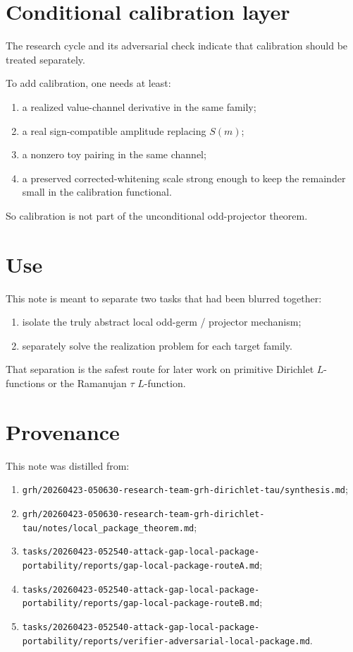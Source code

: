 \documentclass[11pt]{article}
\begin{document}
\section{Conditional calibration layer}

The research cycle and its adversarial check indicate that calibration should
be treated separately.

To add calibration, one needs at least:

\begin{enumerate}
\item a realized value-channel derivative in the same family;
\item a real sign-compatible amplitude replacing \(S(m)\);
\item a nonzero toy pairing in the same channel;
\item a preserved corrected-whitening scale strong enough to keep the remainder
small in the calibration functional.
\end{enumerate}

So calibration is not part of the unconditional odd-projector theorem.

\section{Use}

This note is meant to separate two tasks that had been blurred together:

\begin{enumerate}
\item isolate the truly abstract local odd-germ / projector mechanism;
\item separately solve the realization problem for each target family.
\end{enumerate}

That separation is the safest route for later work on primitive Dirichlet
\(L\)-functions or the Ramanujan \(\tau\) \(L\)-function.

\section{Provenance}

This note was distilled from:

\begin{enumerate}
\item \texttt{grh/20260423-050630-research-team-grh-dirichlet-tau/synthesis.md};
\item \texttt{grh/20260423-050630-research-team-grh-dirichlet-tau/notes/local_package_theorem.md};
\item \texttt{tasks/20260423-052540-attack-gap-local-package-portability/reports/gap-local-package-routeA.md};
\item \texttt{tasks/20260423-052540-attack-gap-local-package-portability/reports/gap-local-package-routeB.md};
\item \texttt{tasks/20260423-052540-attack-gap-local-package-portability/reports/verifier-adversarial-local-package.md}.
\end{enumerate}
\end{document}
